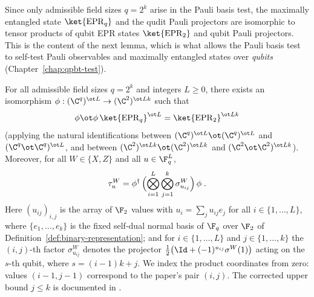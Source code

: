 Since only admissible field sizes $q = 2^k$ arise in the Pauli basis test, the
maximally entangled state $\ket{\mathrm{EPR}_q}$ and the qudit Pauli
projectors are isomorphic to tensor products of qubit EPR states
$\ket{\mathrm{EPR}_2}$ and qubit Pauli projectors. This is the content of the
next lemma, which is what allows the Pauli basis test to self-test Pauli
observables and maximally entangled states over \emph{qubits}
(Chapter~\ref{chap:qpbt-test}).

\begin{lemma}\label{lem:pauli-binary}
	\leanok
	For all admissible field sizes $q = 2^k$ and integers $L \ge 0$, there
	exists an isomorphism $\phi : (\C^q)^{\ot L} \to (\C^2)^{\ot Lk}$ such that
	\begin{equation}\label{eq:epr-q-to-epr-2}
		\phi \ot \phi\, \ket{\mathrm{EPR}_q}^{\ot L}
		= \ket{\mathrm{EPR}_2}^{\ot Lk}
	\end{equation}
	(applying the natural identifications between
	$(\C^q)^{\ot L} \ot (\C^q)^{\ot L}$ and $(\C^q \ot \C^q)^{\ot L}$, and
	between $(\C^2)^{\ot Lk} \ot (\C^2)^{\ot Lk}$ and
	$(\C^2 \ot \C^2)^{\ot Lk}$). Moreover, for all $W \in \{X, Z\}$ and all
	$u \in \F_q^L$,
	\begin{equation}\label{eq:pauli-q-to-pauli-2}
		\tau^W_u = \phi^\dagger\,
		\Bigl(\bigotimes_{i=1}^L \bigotimes_{j=1}^k
		\sigma^W_{u_{ij}}\Bigr)\, \phi\;.
	\end{equation}
	Here $(u_{ij})_{i,j}$ is the array of $\F_2$ values with
	$u_i = \sum_j u_{ij} e_j$ for all $i \in \{1, \dots, L\}$, where
	$\{e_1, \dots, e_k\}$ is the fixed self-dual normal basis of $\F_q$ over
	$\F_2$ of Definition~\ref{def:binary-representation}; and for
	$i \in \{1, \dots, L\}$ and $j \in \{1, \dots, k\}$ the $(i,j)$-th factor
	$\sigma^W_{u_{ij}}$ denotes the projector
	$\frac{1}{2}\bigl(\Id + (-1)^{u_{ij}} \sigma^W(1)\bigr)$ acting on the
	$s$-th qubit, where $s = (i-1)k + j$.
	We index the product coordinates from zero: values $(i-1,j-1)$ correspond to
	the paper's pair $(i,j)$.  The corrected upper bound $j\leq k$ is
	documented in \cite{gap:qpbt_pauli-binary-factor-index}.
\end{lemma}
